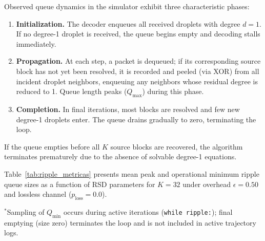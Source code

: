 Observed queue dynamics in the simulator exhibit three characteristic phases:
\begin{enumerate}
    \item \textbf{Initialization.} The decoder enqueues all received droplets with degree $d = 1$. If no degree-1 droplet is received, the queue begins empty and decoding stalls immediately.
    \item \textbf{Propagation.} At each step, a packet is dequeued; if its corresponding source block has not yet been resolved, it is recorded and peeled (via XOR) from all incident droplet neighbors, enqueuing any neighbors whose residual degree is reduced to 1. Queue length peaks ($Q_{\max}$) during this phase.
    \item \textbf{Completion.} In final iterations, most blocks are resolved and few new degree-1 droplets enter. The queue drains gradually to zero, terminating the loop.
\end{enumerate}

If the queue empties before all $K$ source blocks are recovered, the algorithm terminates prematurely due to the absence of solvable degree-1 equations.

Table~\ref{tab:ripple_metricas} presents mean peak and operational minimum ripple queue sizes as a function of RSD parameters for $K = 32$ under overhead $\epsilon = 0.50$ and lossless channel ($p_{\text{loss}} = 0.0$).

\begin{table}[htbp]
    \centering
    \small
    \caption{Mean peak and operational minimum ripple queue sizes as a function of $c$ and $\delta$ ($K = 32$, $\epsilon = 0.50$, $p_{\text{loss}} = 0.0$, 1,000 runs per configuration).}
    \label{tab:ripple_metricas}
    \par \vspace{3pt}
    {\footnotesize $^*$Sampling of $Q_{\min}$ occurs during active iterations (\texttt{while ripple:}); final emptying (size zero) terminates the loop and is not included in active trajectory logs.}
\end{table}

